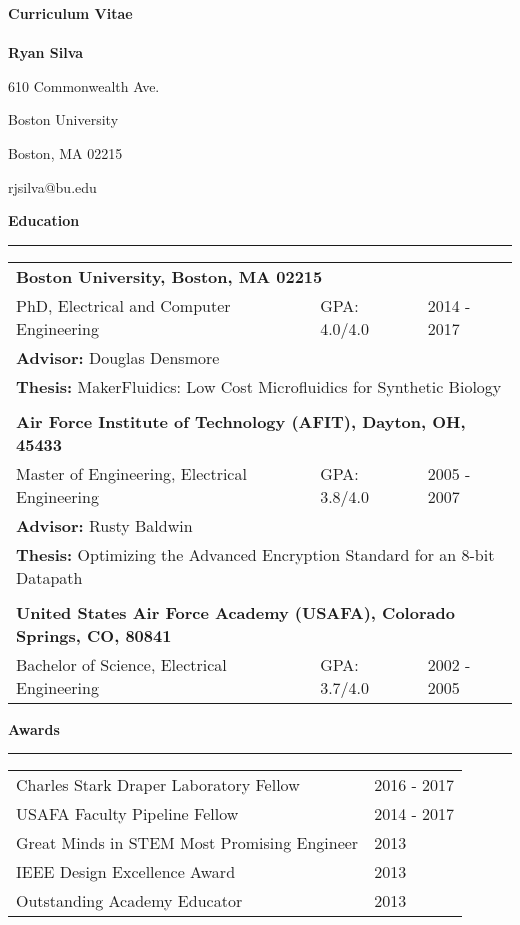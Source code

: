 
{\centering
\huge
\textbf{Curriculum Vitae}\\
\Large
\hspace{1cm}  \\
\textbf{Ryan Silva}

\normalsize
610 Commonwealth Ave.

Boston University

Boston, MA 02215

rjsilva@bu.edu\\[1cm]
}
\large
\textbf{Education}\\
\rule{\textwidth}{1pt}

\begin{table}[h!]
\centering
\small
\begin{tabular}{ p{9.5cm} p{2.5cm} p{4.5cm}}
	\multicolumn{3}{l}{\textbf{Boston University, Boston, MA 02215}}\\
	PhD, Electrical and Computer Engineering & GPA: 4.0/4.0 & 2014 - 2017\\
	\multicolumn{3}{l}{\textbf{Advisor: }Douglas Densmore}\\
	\multicolumn{3}{l}{\textbf{Thesis: }MakerFluidics: Low Cost Microfluidics for Synthetic Biology}\\
	 & & \\
	\multicolumn{3}{l}{\textbf{Air Force Institute of Technology (AFIT), Dayton, OH, 45433}}\\
	Master of Engineering, Electrical Engineering & GPA: 3.8/4.0 & 2005 - 2007\\
	\multicolumn{3}{l}{\textbf{Advisor: }Rusty Baldwin}\\
	\multicolumn{3}{l}{\textbf{Thesis: }Optimizing the Advanced Encryption Standard for an 8-bit Datapath}\\
	 & & \\
	\multicolumn{3}{l}{\textbf{United States Air Force Academy (USAFA), Colorado Springs, CO, 80841}}\\
	Bachelor of Science, Electrical Engineering & GPA: 3.7/4.0 & 2002 - 2005\\
\end{tabular}
\end{table}

\large
\textbf{Awards}\\
\rule{\textwidth}{1pt}

\begin{table}[h!]
\centering
\small
\begin{tabular}{ p{12.5cm} p{4.5cm}}
	Charles Stark Draper Laboratory Fellow & 2016 - 2017 \\
	USAFA Faculty Pipeline Fellow & 2014 - 2017 \\
	Great Minds in STEM Most Promising Engineer & 2013 \\
	IEEE Design Excellence Award & 2013 \\
	Outstanding Academy Educator & 2013
\end{tabular}
\end{table}

